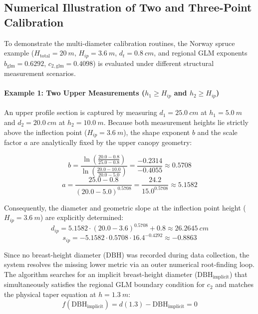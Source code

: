 \documentclass[twocolumn, bibliography=totoc]{scrartcl}
\begin{document}
\subsection{Numerical Illustration of Two and Three-Point Calibration}

To demonstrate the multi-diameter calibration routines, the Norway spruce example ($H_{\text{total}} = \qty{20}{m}$, $H_{ip} = \qty{3.6}{m}$, $d_t = \qty{0.8}{cm}$, and regional GLM exponents $b_{\text{glm}} = 0.6292$, $c_{2,\text{glm}} = 0.4098$) is evaluated under different structural measurement scenarios.

\paragraph{Example 1: Two Upper Measurements ($h_1 \geq H_{ip}$ and $h_2 \geq H_{ip}$)}
An upper profile section is captured by measuring $d_1 = \qty{25.0}{cm}$ at $h_1 = \qty{5.0}{m}$ and $d_2 = \qty{20.0}{cm}$ at $h_2 = \qty{10.0}{m}$. Because both measurement heights lie strictly above the inflection point ($H_{ip} = \qty{3.6}{m}$), the shape exponent $b$ and the scale factor $a$ are analytically fixed by the upper canopy geometry:

\begin{equation}
    b = \frac{\ln\left(\frac{20.0 - 0.8}{25.0 - 0.8}\right)}{\ln\left(\frac{20.0 - 10.0}{20.0 - 5.0}\right)} = \frac{-0.2314}{-0.4055} \approx 0.5708
\end{equation}
\begin{equation}
    a = \frac{25.0 - 0.8}{(20.0 - 5.0)^{0.5708}} = \frac{24.2}{15.0^{0.5708}} \approx 5.1582
\end{equation}

Consequently, the diameter and geometric slope at the inflection point height ($H_{ip} = \qty{3.6}{m}$) are explicitly determined:
\begin{equation}
    d_{ip} = 5.1582 \cdot (20.0 - 3.6)^{0.5708} + 0.8 \approx \qty{26.2645}{cm}
\end{equation}
\begin{equation}
    s_{ip} = -5.1582 \cdot 0.5708 \cdot 16.4^{-0.4292} \approx -0.8863
\end{equation}

Since no breast-height diameter ($\text{DBH}$) was recorded during data collection, the system resolves the missing lower metric via an outer numerical root-finding loop. The algorithm searches for an implicit breast-height diameter ($\text{DBH}_{\text{implicit}}$) that simultaneously satisfies the regional GLM boundary condition for $c_2$ and matches the physical taper equation at $h = \qty{1.3}{m}$:
\begin{equation}
    f(\text{DBH}_{\text{implicit}}) = d(1.3) - \text{DBH}_{\text{implicit}} = 0
\end{equation}
\end{document}
